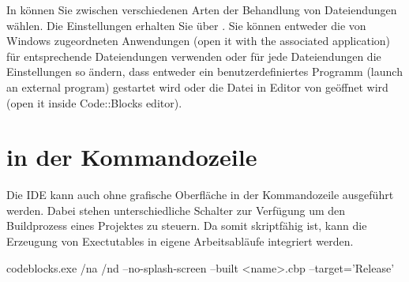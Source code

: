 In \codeblocks können Sie zwischen verschiedenen Arten der Behandlung von Dateiendungen wählen.  Die Einstellungen erhalten Sie über .
Sie können entweder die von Windows zugeordneten Anwendungen (open it with the associated application) für entsprechende Dateiendungen verwenden oder für jede Dateiendungen die Einstellungen so ändern, dass entweder ein benutzerdefiniertes Programm (launch an external program) gestartet wird oder die Datei in Editor von \codeblocks geöffnet wird (open it inside Code::Blocks editor).


\section{\codeblocks in der Kommandozeile}

Die IDE \codeblocks kann auch ohne grafische Oberfläche in der Kommandozeile ausgeführt werden. Dabei stehen unterschiedliche Schalter zur Verfügung um den Buildprozess eines Projektes zu steuern. Da \codeblocks somit skriptfähig ist, kann die Erzeugung von Exectutables in eigene Arbeitsabläufe integriert werden.

\begin{cmd}
codeblocks.exe /na /nd --no-splash-screen --built <name>.cbp --target='Release'
\end{cmd}

